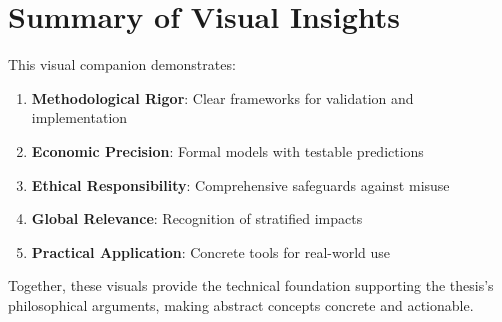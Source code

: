 \documentclass[
  a4paper,
]{report}
\providecommand{\tightlist}{%
  \setlength{\itemsep}{0pt}\setlength{\parskip}{0pt}}
\begin{document}
\section{Summary of Visual Insights}\label{summary-of-visual-insights}

This visual companion demonstrates:

\begin{enumerate}
\def\labelenumi{\arabic{enumi}.}
\tightlist
\item
  \textbf{Methodological Rigor}: Clear frameworks for validation and
  implementation
\item
  \textbf{Economic Precision}: Formal models with testable predictions
\item
  \textbf{Ethical Responsibility}: Comprehensive safeguards against
  misuse
\item
  \textbf{Global Relevance}: Recognition of stratified impacts
\item
  \textbf{Practical Application}: Concrete tools for real-world use
\end{enumerate}

Together, these visuals provide the technical foundation supporting the
thesis's philosophical arguments, making abstract concepts concrete and
actionable.
\end{document}
